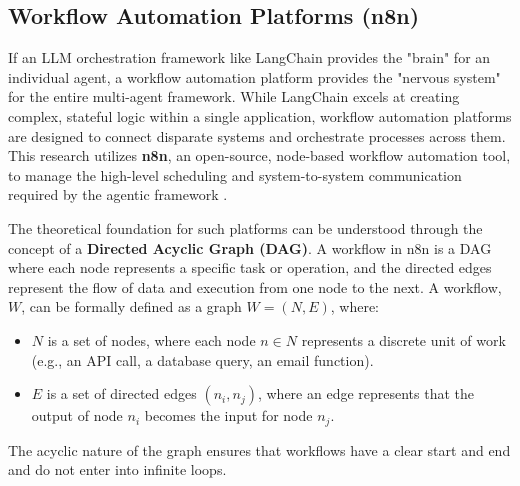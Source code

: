 

\subsection{Workflow Automation Platforms (n8n)}
\label{subsec:n8n}

If an LLM orchestration framework like LangChain provides the "brain" for an individual agent, a workflow automation platform provides the "nervous system" for the entire multi-agent framework. While LangChain excels at creating complex, stateful logic within a single application, workflow automation platforms are designed to connect disparate systems and orchestrate processes across them. This research utilizes \textbf{n8n}, an open-source, node-based workflow automation tool, to manage the high-level scheduling and system-to-system communication required by the agentic framework \cite{FIND_CITATION_PLEASE}.

The theoretical foundation for such platforms can be understood through the concept of a \textbf{Directed Acyclic Graph (DAG)}. A workflow in n8n is a DAG where each node represents a specific task or operation, and the directed edges represent the flow of data and execution from one node to the next. A workflow, $W$, can be formally defined as a graph $W = (N, E)$, where:
\begin{itemize}
    \item $N$ is a set of nodes, where each node $n \in N$ represents a discrete unit of work (e.g., an API call, a database query, an email function).
    \item $E$ is a set of directed edges $(n_i, n_j)$, where an edge represents that the output of node $n_i$ becomes the input for node $n_j$.
\end{itemize}
The acyclic nature of the graph ensures that workflows have a clear start and end and do not enter into infinite loops.

